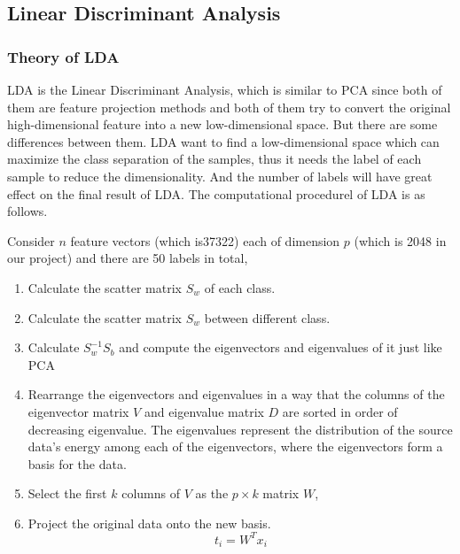 \documentclass{article}
\begin{document}
\subsection{Linear Discriminant Analysis}
\subsubsection{Theory of LDA}
	LDA is the Linear Discriminant Analysis, which is similar to PCA since both of them are feature projection methods and both of them try to convert the original high-dimensional feature into a new low-dimensional space. But there are some differences between them. LDA want to find a low-dimensional space which can maximize the class separation of the samples, thus it needs the label of each sample to reduce the dimensionality. And the number of labels will have great effect on the final result of LDA. The computational procedurel of LDA is as follows.
	
	Consider $n$ feature vectors (which is37322) each of dimension $p$ (which is 2048 in our project) and there are 50 labels in total, 
\begin{enumerate}
\item Calculate the scatter matrix $S_w$ of each class.

\item Calculate the scatter matrix $S_w$  between different class.

\item Calculate $S^{-1}_wS_b$ and compute the eigenvectors and eigenvalues of it just like PCA

\item Rearrange the eigenvectors and eigenvalues in a way that the columns of the eigenvector matrix $V$ and eigenvalue matrix $D$ are sorted in order of decreasing eigenvalue. The eigenvalues represent the distribution of the source data's energy among each of the eigenvectors, where the eigenvectors form a basis for the data.

\item Select the first $k$ columns of $V$ as the $p \times k$ matrix $W$, 

\item Project the original data onto the new basis. 
\begin{equation}
	t_i = W^T x_i \label{eq:proj}
\end{equation}

\end{enumerate}
\end{document}
